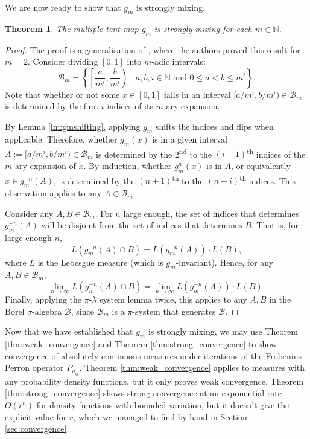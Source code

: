 \documentclass[a4paper]{article}
\newtheorem{theorem}{Theorem}%
\theoremstyle{definition}
\numberwithin{equation}{section}
\numberwithin{theorem}{section}
\begin{document}
{We are now ready to show that $g_m$ is strongly mixing.

\begin{theorem}
    The multiple-tent map $g_m$ is strongly mixing for each $m\in\mathbb{N}$.
\end{theorem}
\begin{proof}
    The proof is a generalisation of \cite[Solution 3.4.5]{boyarsky1997laws}, where the authors proved this result for $m=2$. Consider dividing $[0,1]$ into $m$-adic intervals:
    \begin{equation}
    \mathcal{B}_m = \left\{\left[\frac{a}{m^i},\frac{b}{m^i}\right) \ : \ a,b,i\in\mathbb{N} \text{ and } 0\leq a<b\leq m^i\right\}.
    \end{equation}
    Note that whether or not some $x\in[0,1]$ falls in an interval $[a/m^i, b/m^i)\in\mathcal{B}_m$ is determined by the first $i$ indices of its $m$-ary expansion.
    
    
    By Lemma \ref{lm:gmshifting}, applying $g_m$ shifts the indices and flips when applicable. Therefore, whether $g_m(x)$ is in a given interval $A:=[a/m^i, b/m^i)\in\mathcal{B}_m$ is determined by the 2\textsuperscript{nd} to the $(i+1)$\textsuperscript{th} indices of the $m$-ary expansion of $x$. By induction, whether $g_m^n(x)$ is in $A$, or equivalently $x\in g_m^{-n}(A)$, is determined by the $(n+1)$\textsuperscript{th} to the $(n+i)$\textsuperscript{th} indices. This observation applies to any $A\in\mathcal{B}_m$.

    Consider any $A,B\in\mathcal{B}_m$. For $n$ large enough, the set of indices that determines $g_m^{-n}(A)$ will be disjoint from the set of indices that determines $B$. That is, for large enough $n$,
    \begin{equation*}
        L(g_m^{-n}(A)\cap B) = L(g_m^{-n}(A))\cdot L(B),
    \end{equation*}
    where $L$ is the Lebesgue measure (which is $g_m$-invariant). Hence, for any $A,B \in\mathcal{B}_m$, 
    \begin{equation}
    \lim_{n\rightarrow\infty}L(g_m^{-n}(A)\cap B) = \lim_{n\rightarrow\infty} L(g_m^{-n}(A))\cdot L(B).
    \end{equation}
    Finally, applying the $\pi$-$\lambda$ system lemma twice, this applies to any $A,B$ in the Borel $\sigma$-algebra $\mathcal{B}$, since $\mathcal{B}_m$ is a $\pi$-system that generates $\mathcal{B}$.
\end{proof}

Now that we have established that $g_m$ is strongly mixing, we may use Theorem \ref{thm:weak_convergence} and Theorem \ref{thm:strong_convergence} to show convergence of absolutely continuous measures under iterations of the Frobenius-Perron operator $P_{g_m}$. Theorem \ref{thm:weak_convergence} applies to measures with any probability density functions, but it only proves weak convergence. Theorem \ref{thm:strong_convergence} shows strong convergence at an exponential rate $O(r^n)$ for density functions with bounded variation, but it doesn't give the explicit value for $r$, which we managed to find by hand in Section \ref{sec:convergence}.




}
\end{document}
